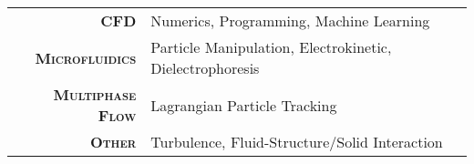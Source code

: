 
\vspace{10pt}

\begin{tabular}{rl}
  \textsc{\textbf{CFD}} & Numerics, Programming, Machine Learning \\
  \textsc{\textbf{Microfluidics}} & Particle Manipulation, Electrokinetic, Dielectrophoresis \\
  \textsc{\textbf{Multiphase Flow}} & Lagrangian Particle Tracking \\
  \textsc{\textbf{Other}} & Turbulence, Fluid-Structure/Solid Interaction
\end{tabular}
